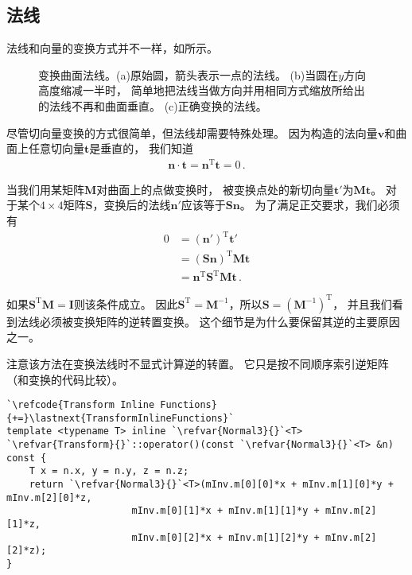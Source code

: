 \subsection{法线}\label{sub:法线}
法线和向量的变换方式并不一样，如所示。
\begin{figure}[htbp]
    \centering
    \caption{变换曲面法线。(a)原始圆，箭头表示一点的法线。
        (b)当圆在$y$方向高度缩减一半时，
        简单地把法线当做方向并用相同方式缩放所给出的法线不再和曲面垂直。
        (c)正确变换的法线。}
    \label{fig:2.14}
\end{figure}

尽管切向量变换的方式很简单，但法线却需要特殊处理。
因为构造的法向量$\bm v$和曲面上任意切向量$\bm t$是垂直的，
我们知道
\begin{align*}
    \bm n\cdot\bm t=\bm n^\mathrm{T}\bm t=0\, .
\end{align*}

当我们用某矩阵$\bm M$对曲面上的点做变换时，
被变换点处的新切向量$\bm t'$为$\bm M\bm t$。
对于某个$4\times4$矩阵$\bm S$，变换后的法线$\bm n'$应该等于$\bm S\bm n$。
为了满足正交要求，我们必须有
\begin{align*}
    0 & =(\bm n')^\mathrm{T}\bm t'                      \\
      & =(\bm S\bm n)^\mathrm{T}\bm M\bm t              \\
      & =\bm n^\mathrm{T}\bm S^\mathrm{T}\bm M\bm t\, .
\end{align*}

如果$\bm S^\mathrm{T}\bm M=\bm I$则该条件成立。
因此$\bm S^\mathrm{T}=\bm M^{-1}$，所以$\bm S=(\bm M^{-1})^\mathrm{T}$，
并且我们看到法线必须被变换矩阵的逆转置变换。
这个细节是为什么要保留其逆的主要原因之一。

注意该方法在变换法线时不显式计算逆的转置。
它只是按不同顺序索引逆矩阵（和变换的代码比较）。
\begin{lstlisting}
`\refcode{Transform Inline Functions}{+=}\lastnext{TransformInlineFunctions}`
template <typename T> inline `\refvar{Normal3}{}`<T>
`\refvar{Transform}{}`::operator()(const `\refvar{Normal3}{}`<T> &n) const {
    T x = n.x, y = n.y, z = n.z;
    return `\refvar{Normal3}{}`<T>(mInv.m[0][0]*x + mInv.m[1][0]*y + mInv.m[2][0]*z,
                      mInv.m[0][1]*x + mInv.m[1][1]*y + mInv.m[2][1]*z,
                      mInv.m[0][2]*x + mInv.m[1][2]*y + mInv.m[2][2]*z);
}
\end{lstlisting}

